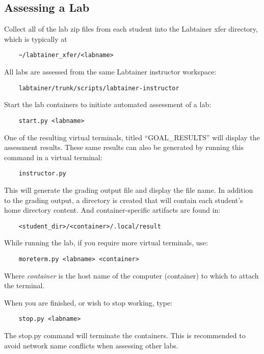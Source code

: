 \documentclass[12pt]{article}
\begin{document}
\subsection{Assessing a Lab}
Collect all of the lab zip files from each student into the Labtainer xfer directory, which
is typically at
\begin{verbatim}
    ~/labtainer_xfer/<labname>
\end{verbatim}
All labs are assessed from the same Labtainer instructor workspace:
\begin{verbatim}
    labtainer/trunk/scripts/labtainer-instructor
\end{verbatim}
\noindent Start the lab containers to initiate automated assessment of a lab:
\begin{verbatim}
    start.py <labname>
\end{verbatim}

One of the resulting virtual terminals, titled ``GOAL\_RESULTS'' will display the assessment results.
These same results can also be generated by running this command in a virtual terminal:
\begin{verbatim}
    instructor.py
\end{verbatim}
\noindent This will generate the grading output file and display the file name.  In
addition to the grading output, a directory is created that will contain each student's
home directory content.  And container-specific artifacts are found in:
\begin{verbatim}
    <student_dir>/<container>/.local/result
\end{verbatim}

\noindent While running the lab, if you require more virtual terminals, use:
\begin{verbatim}
    moreterm.py <labname> <container>
\end{verbatim}
\noindent Where \textit{container} is the host name of the computer (container) to which to attach the terminal.

\noindent When you are finished, or wish to stop working, type:
\begin{verbatim}
    stop.py <labname>
\end{verbatim}
The stop.py command will terminate the containers.  This is recommended to avoid network
name conflicts when assessing other labs.
\end{document}
